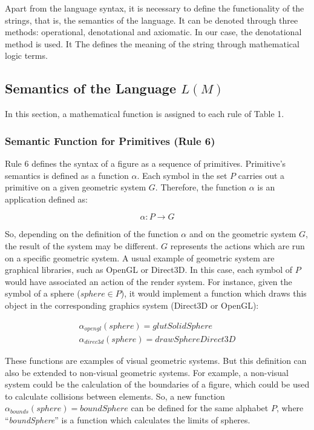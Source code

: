 \documentclass[runningheads]{llncs}
\begin{document}
Apart from the language syntax, it is necessary to define the functionality of the strings, that is,
the semantics of the language. It can be denoted through three methods: operational, denotational and axiomatic. In our case, the denotational method is used. It The defines the meaning of the string through mathematical logic terms.


\subsection{Semantics of the Language $L(M)$
\label{sec:semantic}}

In this section, a mathematical function is assigned to each rule of Table 1.


\subsubsection{Semantic Function for Primitives (Rule 6)
\label{sec:rule6}}

Rule 6 defines the syntax of a figure as a sequence of primitives. Primitive's semantics is defined
as a function $\alpha$. Each symbol in the set $P$ carries out a primitive on a given geometric
system $G$. Therefore, the function $\alpha$ is an application defined as:	
	
\begin{equation}
    \alpha: P \rightarrow G
\end{equation}
	
So, depending on the definition of the function $\alpha$ and on the geometric system $G$, the result of the system may be different. $G$ represents the actions which are run on a specific geometric system. A usual example of geometric system are graphical libraries, such as OpenGL or Direct3D. In this
case, each symbol of $P$ would have associated an action of the render system. For instance, given
the symbol of a sphere ($sphere \in P$), it would implement a function which draws this object in
the corresponding graphics system (Direct3D or OpenGL):	
	
\[ \begin{matrix}
    \alpha_{opengl}(sphere) = glutSolidSphere \\
    \alpha_{direc3d}(sphere) = drawSphereDirect3D
\end{matrix} \]

These functions are examples of visual geometric systems. But this definition can also be extended
to non-visual geometric systems. For example, a non-visual system could be the calculation of the
boundaries of a figure, which could be used to calculate collisions between elements. So, a new
function $\alpha_{bounds}(sphere) = boundSphere$ can be defined for the same alphabet $P$, where
``\textit{boundSphere}'' is a function which calculates the limits of spheres.
	
\end{document}
